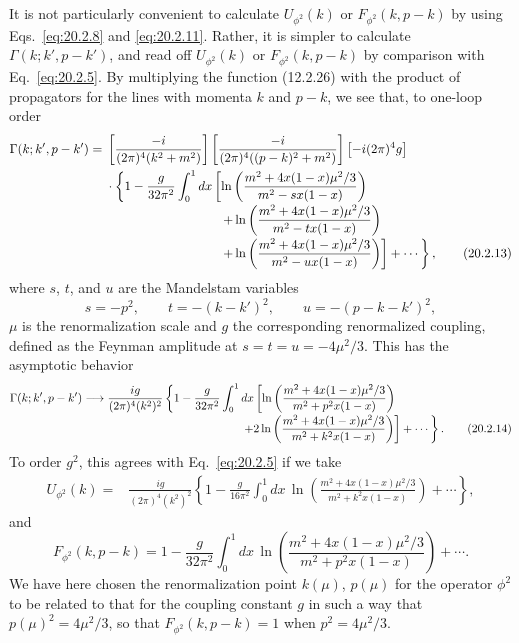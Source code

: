 It is not particularly convenient to calculate $U_{\phi^2}(k)$ or
$F_{\phi^2}(k,p-k)$ by using Eqs.~\eqref{eq:20.2.8} and
\eqref{eq:20.2.11}. Rather, it is simpler to calculate
$\Gamma(k;k',p-k')$, and read off $U_{\phi^2}(k)$ or
$F_{\phi^2}(k,p-k)$ by comparison with Eq.~\eqref{eq:20.2.5}. By
multiplying the function (12.2.26) with the product of propagators for the
lines with momenta $k$ and $p-k$, we see that, to one-loop order
\begin{align}
 \Gamma(k;k',p-k')={}&
 \left[\frac{-i}{(2\pi)^4(k^2+m^2)}\right]
 \left[\frac{-i}{(2\pi)^4((p-k)^2+m^2)}\right]
 \left[-i(2\pi)^4g\right]
 \notag\\
 &\cdot\left\{1-\frac{g}{32\pi^2}\int_0^1dx
 \left[
 \ln\left(\frac{m^2+4x(1-x)\mu^2/3}{m^2-sx(1-x)}\right)
 \right.\right.
 \notag\\[-2pt]
 &\hspace{31mm}\left.\left.
 +\ln\left(\frac{m^2+4x(1-x)\mu^2/3}{m^2-tx(1-x)}\right)
 \right.\right.
 \notag\\[-2pt]
 &\hspace{31mm}\left.\left.
 +\ln\left(\frac{m^2+4x(1-x)\mu^2/3}{m^2-ux(1-x)}\right)
 \right]+\cdots\right\},
 \tag{20.2.13}\label{eq:20.2.13}
\end{align}
where $s$, $t$, and $u$ are the Mandelstam variables
\[
 s=-p^2,\qquad t=-(k-k')^2,\qquad u=-(p-k-k')^2,
\]
$\mu$ is the renormalization scale and $g$ the corresponding renormalized
coupling, defined as the Feynman amplitude at
$s=t=u=-4\mu^2/3$. This has the asymptotic behavior
\begin{align}
 \Gamma(k;k',p-k')\longrightarrow{}&
 \frac{ig}{(2\pi)^4(k^2)^2}
 \left\{1-\frac{g}{32\pi^2}\int_0^1dx
 \left[
 \ln\left(\frac{m^2+4x(1-x)\mu^2/3}
 {m^2+p^2x(1-x)}\right)
 \right.\right.
 \notag\\[-2pt]
 &\hspace{40mm}\left.\left.
 +2\ln\left(\frac{m^2+4x(1-x)\mu^2/3}
 {m^2+k^2x(1-x)}\right)
 \right]+\cdots\right\}.
 \tag{20.2.14}\label{eq:20.2.14}
\end{align}
To order $g^2$, this agrees with Eq.~\eqref{eq:20.2.5} if we take
\begin{align}
 U_{\phi^2}(k)={}&\frac{ig}{(2\pi)^4(k^2)^2}
 \left\{1-\frac{g}{16\pi^2}\int_0^1dx\,
 \ln\left(\frac{m^2+4x(1-x)\mu^2/3}
 {m^2+k^2x(1-x)}\right)+\cdots\right\},
 \tag{20.2.15}\label{eq:20.2.15}
\end{align}
and
\begin{equation}
 F_{\phi^2}(k,p-k)=1-\frac{g}{32\pi^2}\int_0^1dx\,
 \ln\left(\frac{m^2+4x(1-x)\mu^2/3}
 {m^2+p^2x(1-x)}\right)+\cdots.
 \tag{20.2.16}\label{eq:20.2.16}
\end{equation}
We have here chosen the renormalization point $k(\mu)$, $p(\mu)$ for the
operator $\phi^2$ to be related to that for the coupling constant $g$ in
such a way that $p(\mu)^2=4\mu^2/3$, so that $F_{\phi^2}(k,p-k)=1$ when
$p^2=4\mu^2/3$.

